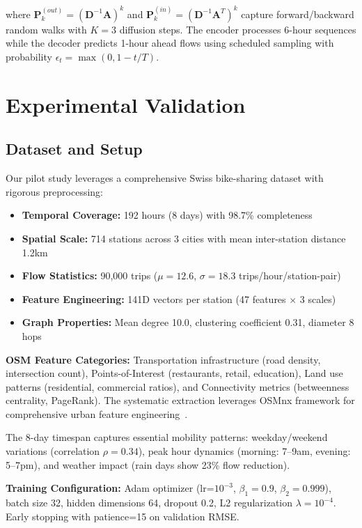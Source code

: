 \documentclass{article}
\begin{document}
where $\mathbf{P}_k^{(out)} = {(\mathbf{D}^{-1}\mathbf{A})}^k$ and $\mathbf{P}_k^{(in)} = {(\mathbf{D}^{-1}\mathbf{A}^T)}^k$ capture forward/backward random walks with $K=3$ diffusion steps. The encoder processes 6-hour sequences while the decoder predicts 1-hour ahead flows using scheduled sampling with probability $\epsilon_t = \max(0, 1 - t/T)$.

\section{Experimental Validation}

\subsection{Dataset and Setup}
Our pilot study leverages a comprehensive Swiss bike-sharing dataset with rigorous preprocessing:
\begin{itemize}
\item \textbf{Temporal Coverage:} 192 hours (8 days) with 98.7\% completeness
\item \textbf{Spatial Scale:} 714 stations across 3 cities with mean inter-station distance 1.2km
\item \textbf{Flow Statistics:} 90,000 trips ($\mu=12.6$, $\sigma=18.3$ trips/hour/station-pair)
\item \textbf{Feature Engineering:} 141D vectors per station (47 features $\times$ 3 scales)
\item \textbf{Graph Properties:} Mean degree 10.0, clustering coefficient 0.31, diameter 8 hops
\end{itemize}

\textbf{OSM Feature Categories:} Transportation infrastructure (road density, intersection count), Points-of-Interest (restaurants, retail, education), Land use patterns (residential, commercial ratios), and Connectivity metrics (betweenness centrality, PageRank). The systematic extraction leverages OSMnx framework for comprehensive urban feature engineering~\cite{boeing2017}.

The 8-day timespan captures essential mobility patterns: weekday/weekend variations (correlation $\rho=0.34$), peak hour dynamics (morning: 7--9am, evening: 5--7pm), and weather impact (rain days show 23\% flow reduction).

\textbf{Training Configuration:} Adam optimizer (lr=$10^{-3}$, $\beta_1=0.9$, $\beta_2=0.999$), batch size 32, hidden dimensions 64, dropout 0.2, L2 regularization $\lambda=10^{-4}$\@. Early stopping with patience=15 on validation RMSE.
\end{document}
